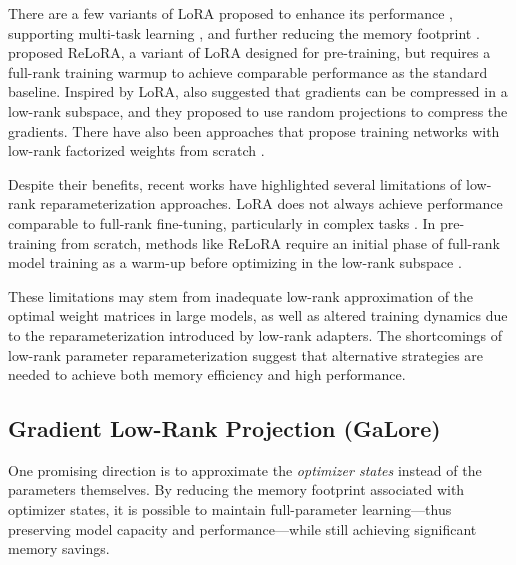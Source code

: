 There are a few variants of LoRA proposed to enhance its performance \citep{renduchintalaTiedLoraEnhacingParameter2023, shengSLoRAServingThousands2023, zhangLORAFAMEMORYEFFICIENTLOWRANK, xiaChainLoRAEfficient2024}, supporting multi-task learning \citep{wangMultiLoRADemocratizingLoRA2023}, and further reducing the memory footprint \citep{dettmersQLoRAEfficientFinetuning2023}.
\citet{lialinReLoRAHighRankTraining2023} proposed ReLoRA, a variant of LoRA designed for pre-training, but requires a full-rank training warmup to achieve comparable performance as the standard baseline. Inspired by LoRA, \citet{haoFloraLowRankAdapters2024} also suggested that gradients can be compressed in a low-rank subspace, and they proposed to use random projections to compress the gradients. There have also been approaches that propose training networks with low-rank factorized weights from scratch \citep{kamalakaraExploringLowRank2022,wangCuttlefishLowrankModel2023,zhaoInRankIncrementalLowRank2023}.

Despite their benefits, recent works have highlighted several limitations of low-rank reparameterization approaches. LoRA does not always achieve performance comparable to full-rank fine-tuning, particularly in complex tasks \citep{xiaChainLoRAEfficient2024}. In pre-training from scratch, methods like ReLoRA require an initial phase of full-rank model training as a warm-up before optimizing in the low-rank subspace \citep{lialinReLoRAHighRankTraining2023}.

These limitations may stem from inadequate low-rank approximation of the optimal weight matrices in large models, as well as altered training dynamics due to the reparameterization introduced by low-rank adapters. The shortcomings of low-rank parameter reparameterization suggest that alternative strategies are needed to achieve both memory efficiency and high performance.

\subsection{Gradient Low-Rank Projection (GaLore)}

One promising direction is to approximate the \emph{optimizer states} instead of the parameters themselves. By reducing the memory footprint associated with optimizer states, it is possible to maintain full-parameter learning—thus preserving model capacity and performance—while still achieving significant memory savings.

